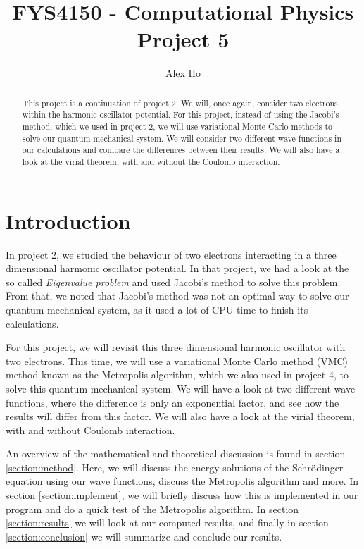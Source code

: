 \documentclass[12pt]{article}
\author{Alex Ho}
\title{FYS4150 - Computational Physics \\ Project 5}
\begin{document}
\maketitle
\begin{abstract}
This project is a continuation of project 2. We will, once again, consider two electrons within the harmonic oscillator potential. For this project, instead of using the Jacobi's method, which we used in project 2, we will use variational Monte Carlo methods to solve our quantum mechanical system. We will consider two different wave functions in our calculations and compare the differences between their results. We will also have a look at the virial theorem, with and without the Coulomb interaction.
\end{abstract}
\newpage
\tableofcontents
\newpage
\section{Introduction} \label{section:intro}
In project 2, we studied the behaviour of two electrons interacting in a three dimensional harmonic oscillator potential. In that project, we had a look at the so called \emph{Eigenvalue problem} and used Jacobi's method to solve this problem. From that, we noted that Jacobi's method was not an optimal way to solve our quantum mechanical system, as it used a lot of CPU time to finish its calculations.

For this project, we will revisit this three dimensional harmonic oscillator with two electrons. This time, we will use a variational Monte Carlo method (VMC) method known as the Metropolis algorithm, which we also used in project 4, to solve this quantum mechanical system. We will have a look at two different wave functions, where the difference is only an exponential factor, and see how the results will differ from this factor. We will also have a look at the virial theorem, with and without Coulomb interaction.

An overview of the mathematical and theoretical discussion is found in section \ref{section:method}. Here, we will discuss the energy solutions of the Schrödinger equation using our wave functions, discuss the Metropolis algorithm and more. In section \ref{section:implement}, we will briefly discuss how this is implemented in our program and do a quick test of the Metropolis algorithm. In section \ref{section:results} we will look at our computed results, and finally in section \ref{section:conclusion} we will summarize and conclude our results.
\end{document}
